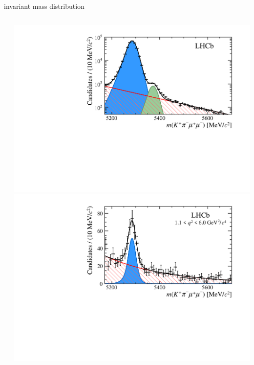 \documentclass[aspectratio=1610]{beamer}
\begin{document}
\begin{frame}{\mkpimm invariant mass distribution}
\begin{columns}
\begin{column}{0.6\textwidth}
\end{column}
\begin{column}{0.4\textwidth}
\includegraphics[width=\textwidth]{figs/kpimm/massfit/fit_jpsi_log.pdf}\\
\includegraphics[width=\textwidth]{figs/kpimm/massfit/fitKpimumu_q2_1p1_6p0.pdf}
\end{column}
\end{columns}
\end{frame}
\end{document}
